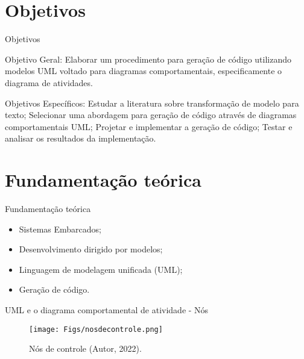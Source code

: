 \documentclass[handout,aspectratio = 169]{beamer}
\begin{document}
\section{Objetivos}
\begin{frame}{Objetivos}
    \begin{outline}
        \1 Objetivo Geral:
        Elaborar um procedimento para geração de código utilizando modelos UML voltado para diagramas comportamentais, especificamente o diagrama de atividades.
    \end{outline}

    \begin{outline}
        \1 Objetivos Específicos:
        \2 Estudar a literatura sobre transformação de modelo para texto;
        \2 Selecionar uma abordagem para geração de código através de diagramas comportamentais UML;
        \2 Projetar e implementar a geração de código;
        \2 Testar e analisar os resultados da implementação.
    \end{outline}
\end{frame}


\section{Fundamentação teórica}
\begin{frame}{Fundamentação teórica}
    \begin{itemize}
        \item Sistemas Embarcados;
        \item Desenvolvimento dirigido por modelos;
        \item Linguagem de modelagem unificada (UML);
        \item Geração de código.
    \end{itemize}
\end{frame}

\begin{frame}{UML e o diagrama comportamental de atividade - Nós}
    \begin{figure}
            \centering
             \texttt{[image: Figs/nosdecontrole.png]}
            \caption{Nós de controle (Autor, 2022).}
    \end{figure}
\end{frame}
\end{document}
